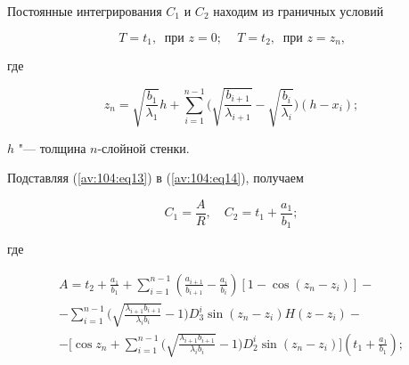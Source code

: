 Постоянные интегрирования $C_{1}$ и $C_{2}$ находим из граничных условий

\begin{equation}

\label{av:104:eq14}

 T=t_1,~\text{ при $z= 0$; } \quad  T=t_2,~\text{ при $z=z_n$,}

 \end{equation}

где

$$

z_n =\sqrt {\frac{b_1 }{\lambda _1 }} h+\sum\limits_{i=1}^{n-1} \biggl(

\sqrt {\frac{b_{i+1} }{\lambda _{i+1} }} -\sqrt {\frac{b_i }{\lambda _i }}

 \biggr) (h-x_i );$$

$h$ "--- толщина $n$-слойной стенки.







Подставляя (\ref{av:104:eq13}) в (\ref{av:104:eq14}), получаем

\begin{equation}

\label{av:104:eq15}

C_1 =\frac{A}{R},

\quad

C_2 =t_1 +\frac{a_1 }{b_1 };

\end{equation}

где

\begin{multline}

\label{av:104:eq16}

A=t_2 +\frac{a_1 }{b_1 }+

\sum\limits_{i=1}^{n-1}

\left(

\frac{a_{i+1} }{b_{i+1} }-\frac{a_i }{b_i }

\right)

[1-\cos (z_n -z_i )]- \\

 -\sum\limits_{i=1}^{n-1}

\biggl( \sqrt {\frac{\lambda _{i+1} b_{i+1} }{\lambda _i b_i }} -1 \biggr)

D_3^i \sin (z_n -z_i )H(z-z_i )-\\-

\biggl[

\cos z_n

+\sum\limits_{i=1}^{n-1}

\biggl( \sqrt {\frac{\lambda _{i+1} b_{i+1}

}{\lambda _i b_i }} -1 \biggr)  D_2^i \sin (z_n -z_i )

\biggr] \left( t_1 +\frac{a_ 1}{ b_ 1 }

\right);

 \end{multline}

